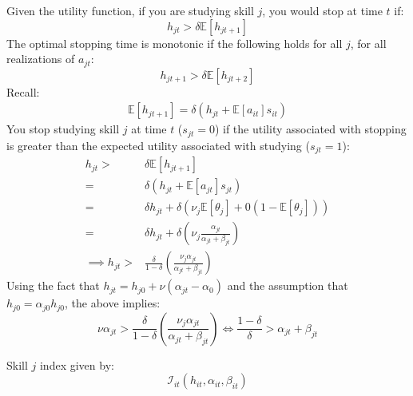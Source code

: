 \documentclass[10 pt]{article}
\newcommand{\sbr}[1]{\left[ #1 \right]}
\newcommand{\pr}[1]{\left( #1 \right)}
\begin{document}
\begin{outline}
Given the utility function, if you are studying skill $j$, you would stop at time $t$ if:
\begin{equation}
h_{jt} > \delta \mathbb{E} \sbr{h_{jt+1}}
\end{equation}
The optimal stopping time is monotonic if the following holds for all $j$, for all realizations of $a_{jt}$:
\begin{equation}
h_{jt+1} > \delta \mathbb{E} \sbr{h_{jt+2}}
\end{equation}
Recall:
\begin{align*}
\mathbb{E} \sbr{h_{jt+1}} = \delta (h_{jt} + \mathbb{E} \sbr{a_{it}} s_{it})
\end{align*}
You stop studying skill $j$ at time $t$ ($s_{jt}=0$) if the utility associated with stopping is greater than the expected utility associated with studying ($s_{jt}=1$):
\begin{align*}
h_{jt} >& \delta \mathbb{E} \sbr{h_{jt+1}} \\
=& \delta (h_{jt} + \mathbb{E} \sbr{a_{jt}} s_{jt}) \\
=& \delta h_{jt} + \delta \pr{\nu_j \mathbb{E} \sbr{\theta_j} + 0 (1 - \mathbb{E} \sbr{\theta_j})} \\
=& \delta h_{jt} + \delta \pr{\nu_j \frac{\alpha_{jt}}{\alpha_{jt} + \beta_{jt}}} \\
\implies h_{jt} >& \frac{\delta}{1 - \delta} \pr{\frac{\nu_j \alpha_{jt}}{\alpha_{jt} + \beta_{jt}}}
\end{align*}
Using the fact that $h_{jt} = h_{j0} + \nu (\alpha_{jt} - \alpha_0)$ and the assumption that $h_{j0} = \alpha_{j0} h_{j0}$, the above implies:
\begin{equation*}
\nu \alpha_{jt} > \frac{\delta}{1 - \delta} \pr{\frac{\nu_j \alpha_{jt}}{\alpha_{jt} + \beta_{jt}}} \iff \frac{1-\delta}{\delta} > \alpha_{jt} + \beta_{jt}
\end{equation*} 

Skill $j$ index given by: 
\begin{equation*}
\mathcal{I}_{it} (h_{it}, \alpha_{it}, \beta_{it})
\end{equation*}

\end{outline}



\printbibliography
\end{document}
